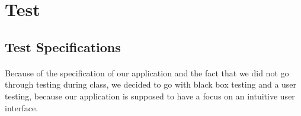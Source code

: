 \documentclass[paper=a4, fontsize=12pt,DIV=14]{scrartcl}    %
\begin{document}
    \newpage
        \section{Test}
        	\subsection{Test Specifications}
        		\paragraph{}Because of the specification of our application and the fact that we did not go through testing during class, we decided to go with black box testing and a user testing, because our application is supposed to have a focus on an intuitive user interface.
\end{document}
